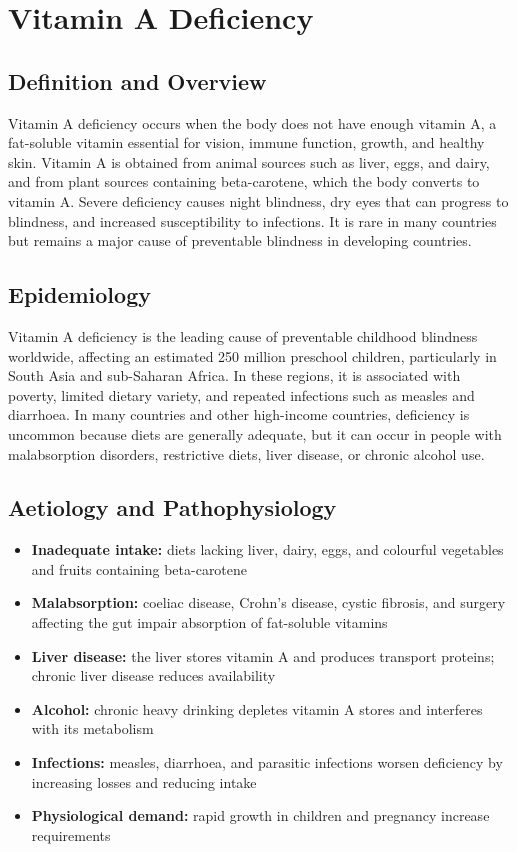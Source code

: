 \chapter{Vitamin A Deficiency}

\section*{Definition and Overview}
Vitamin A deficiency occurs when the body does not have enough vitamin A, a fat-soluble vitamin essential for vision, immune function, growth, and healthy skin. Vitamin A is obtained from animal sources such as liver, eggs, and dairy, and from plant sources containing beta-carotene, which the body converts to vitamin A. Severe deficiency causes night blindness, dry eyes that can progress to blindness, and increased susceptibility to infections. It is rare in many countries but remains a major cause of preventable blindness in developing countries.

\section*{Epidemiology}
Vitamin A deficiency is the leading cause of preventable childhood blindness worldwide, affecting an estimated 250 million preschool children, particularly in South Asia and sub-Saharan Africa. In these regions, it is associated with poverty, limited dietary variety, and repeated infections such as measles and diarrhoea. In many countries and other high-income countries, deficiency is uncommon because diets are generally adequate, but it can occur in people with malabsorption disorders, restrictive diets, liver disease, or chronic alcohol use.

\section*{Aetiology and Pathophysiology}
\begin{itemize}
    \item \textbf{Inadequate intake:} diets lacking liver, dairy, eggs, and colourful vegetables and fruits containing beta-carotene
    \item \textbf{Malabsorption:} coeliac disease, Crohn's disease, cystic fibrosis, and surgery affecting the gut impair absorption of fat-soluble vitamins
    \item \textbf{Liver disease:} the liver stores vitamin A and produces transport proteins; chronic liver disease reduces availability
    \item \textbf{Alcohol:} chronic heavy drinking depletes vitamin A stores and interferes with its metabolism
    \item \textbf{Infections:} measles, diarrhoea, and parasitic infections worsen deficiency by increasing losses and reducing intake
    \item \textbf{Physiological demand:} rapid growth in children and pregnancy increase requirements
\end{itemize}

